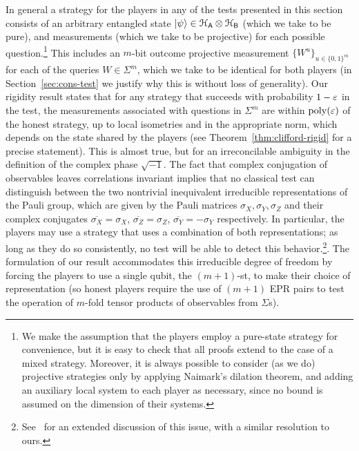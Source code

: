 In general a strategy for the players in any of the tests presented in this section consists of an arbitrary entangled state $|\psi\rangle \in \mathcal{H}_{\textsf{A}} \otimes \mathcal{H}_{\textsf{B}}$ (which we take to be pure), and measurements (which we take to be projective) for each possible question.\footnote{We make the assumption that the players employ a pure-state strategy for convenience, but it is easy to check that all proofs extend to the case of a mixed strategy. Moreover, it is always possible to consider (as we do)  projective strategies only by applying Naimark's dilation theorem, and adding an auxiliary local system to each player as necessary, since no bound is assumed on the dimension of their systems.} This includes an $m$-bit outcome projective measurement $\{W^u\}_{u\in\{0,1\}^{m}}$ for each of the queries $W\in\Sigma^m$, which we take to be identical for both players (in Section~\ref{sec:cons-test} we justify why this is without loss of generality). Our rigidity result states that for any strategy that succeeds with probability $1-\varepsilon$ in the test, the measurements associated with questions in $\Sigma^m$ are within $\operatorname{poly}(\varepsilon)$ of the honest strategy, up to local isometries and in the appropriate norm, which depends on the state shared by the players (see Theorem~\ref{thm:clifford-rigid} for a precise statement). This is almost true, but for an irreconcilable ambiguity in the definition of the complex phase $\sqrt{-1}$. The fact that complex conjugation of observables 
leaves correlations invariant implies that no classical test can distinguish between the two nontrivial inequivalent irreducible representations of the Pauli group, which are given by the Pauli matrices $\sigma_X,\sigma_Y,\sigma_Z$ and their complex conjugates $\overline{\sigma_X}=\sigma_X$, $\overline{\sigma_Z}=\sigma_Z$, $\overline{\sigma_Y}=-\sigma_Y$ respectively. In particular, the players may use a strategy that uses a combination of both representations; as long as they do so consistently, no test will be able to detect this behavior.\footnote{See~\cite[Appendix A]{reichardt2012classicalarxiv} for an extended discussion of this issue, with a similar resolution to ours.}.  The formulation of our result accommodates this irreducible degree of freedom by forcing the players to use a single qubit, the $(m+1)$-st, to make their choice of representation (so honest players require the use of $(m+1)$ EPR pairs to test the operation of $m$-fold tensor products of observables from $\Sigma$s). 

